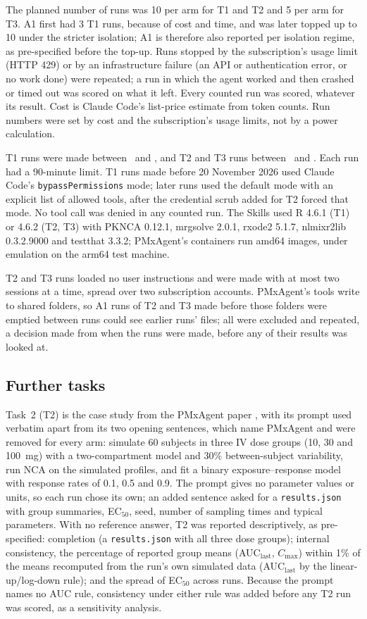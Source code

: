 \documentclass[11pt]{article}
\begin{document}
The planned number of runs was 10 per arm for T1 and T2 and 5 per arm for T3. A1 first had 3 T1 runs, because of cost
and time, and was later topped up to 10 under the stricter isolation; A1 is therefore also reported per isolation
regime, as pre-specified before the top-up. Runs stopped by the subscription's usage limit (HTTP 429) or by an
infrastructure failure (an API or authentication error, or no work done) were repeated; a run in which the agent worked
and then crashed or timed out was scored on what it left. Every counted run was scored, whatever its result. Cost is
Claude Code's list-price estimate from token counts. Run numbers were set by cost and the subscription's usage limits,
not by a power calculation.

T1 runs were made between \numToneFirstDate\ and \numToneLastDate, and T2 and T3 runs between \numTtwoFirstDate\ and
\numTthreeaLastDate. Each run had a 90-minute limit. T1 runs made before 20 November 2026 used Claude Code's
\texttt{bypassPermissions} mode; later runs used the default mode with an explicit list of allowed tools, after the
credential scrub added for T2 forced that mode. No tool call was denied in any counted run. The Skills used R 4.6.1
(T1) or 4.6.2 (T2, T3) with PKNCA 0.12.1, mrgsolve 2.0.1, rxode2 5.1.7, nlmixr2lib 0.3.2.9000 and testthat 3.3.2;
PMxAgent's containers run amd64 images, under emulation on the arm64 test machine.

T2 and T3 runs loaded no user instructions and were made with at most two sessions at a time, spread over two
subscription accounts. PMxAgent's tools write to shared folders, so A1 runs of T2 and T3 made before those folders
were emptied between runs could see earlier runs' files; all were excluded and repeated, a decision made from when the
runs were made, before any of their results was looked at.

\subsection{Further tasks}
Task~2 (T2) is the case study from the PMxAgent paper \cite{bloomingdale2026pmxagent}, with its prompt used verbatim
apart from its two opening sentences, which name PMxAgent and were removed for every arm:
simulate 60 subjects in three IV dose groups (10, 30 and 100~mg) with a two-compartment model and 30\% between-subject
variability, run NCA on the simulated profiles, and fit a binary exposure--response model with response rates of 0.1,
0.5 and 0.9. The prompt gives no parameter values or units, so each run chose its own; an added sentence asked for a
\texttt{results.json} with group summaries, EC$_{50}$, seed, number of sampling times and typical parameters. With no
reference answer, T2 was reported descriptively, as pre-specified: completion (a \texttt{results.json} with all three
dose groups); internal consistency, the percentage of reported group means (AUC$_\mathrm{last}$, $C_\mathrm{max}$)
within 1\% of the means recomputed from the run's own simulated data (AUC$_\mathrm{last}$ by the linear-up/log-down
rule); and the spread of EC$_{50}$ across runs. Because the prompt names no AUC rule, consistency under either rule was
added before any T2 run was scored, as a sensitivity analysis.
\end{document}

